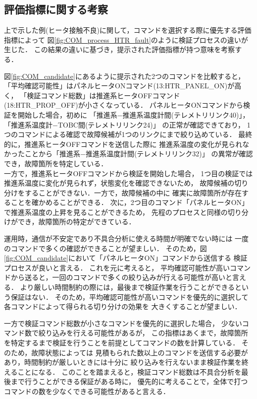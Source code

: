 \documentclass[11pt]{jsreport}
\begin{document}
\subsection{評価指標に関する考察}
上で示した例(ヒータ接触不良)に関して，コマンドを選択する際に優先する評価指標によって
図\ref{fig:COM_process_HTR_fault}のように検証プロセスの違いが生じた．
この結果の違いに基づき，提示された評価指標が持つ意味を考察する．

図\ref{fig:COM_candidate}にあるように提示された2つのコマンドを比較すると，
「平均確認可能性」はパネルヒータONコマンド(13:HTR\_PANEL\_ON)が高く，
「検証コマンド総数」は推進系ヒータOFFコマンド(18:HTR\_PROP\_OFF)が小さくなっている．
パネルヒータONコマンドから検証を開始した場合，初めに
「推進系−推進系温度計間(テレメトリリンク40)」，「推進系温度計−TOBC間(テレメトリリンク24)」
の正常が確認できており，
1つのコマンドによる確認で故障候補が1つのリンクにまで絞り込めている．
最終的に，推進系ヒータOFFコマンドを送信した際に%
推進系温度の変化が見られなかったことから「推進系−推進系温度計間(テレメトリリンク32)」
の異常が確認でき，故障箇所を特定している．\\
一方で，推進系ヒータOFFコマンドから検証を開始した場合，
1つ目の検証では推進系温度に変化が見られず，状態変化を確認できないため，
故障候補の切り分けをすることができない．一方で，故障候補の中に
確実に故障箇所が存在することを確かめることができる．
次に，2つ目のコマンド「パネルヒータON」で推進系温度の上昇を見ることができるため，
先程のプロセスと同様の切り分けができ，故障箇所の特定ができている．

運用時，通信が不安定であり不具合分析に使える時間が明確でない時には
一度のコマンドで多くの確認ができることが望ましい．
そのため，図\ref{fig:COM_candidate}において「パネルヒータON」コマンドから送信する
検証プロセスが良いと言える．
これを元に考えると，
平均確認可能性が高いコマンドから送ると，一回のコマンドで多くの絞り込みが行える可能性が高いと言える．
より厳しい時間制約の際には，最後まで検証作業を行うことができるという保証はない．
そのため，平均確認可能性が高いコマンドを優先的に選択して各コマンドによって得られる切り分けの効果を
大きくすることが望ましい．

一方で検証コマンド総数が小さなコマンドを優先的に選択した場合，
少ないコマンド数で絞り込みを行える可能性があるが，
この指標はあくまで，故障箇所を特定するまで検証を行うことを前提としてコマンドの数を計算している．
そのため，故障状態によっては
見積もられた数以上のコマンドを送信する必要があり，時間制約が厳しいときには十分に
絞り込みを行えないまま検証作業を終えることになる．
このことを踏まえると，検証コマンド総数は不具合分析を最後まで行うことができる保証がある時に，
優先的に考えることで，全体で打つコマンドの数を少なくできる可能性があると言える．
\end{document}
